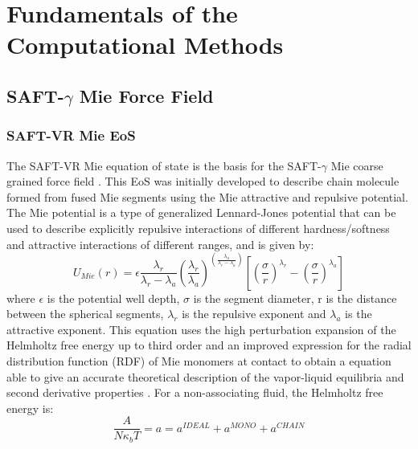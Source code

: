 \chapter{Fundamentals of the Computational Methods} %

\label{Chapter3} %


\section{SAFT-$\gamma$ Mie Force Field}

\subsection{SAFT-VR Mie EoS}

The SAFT-VR Mie equation of state \cite{lafitte2013} is the basis for the SAFT-$\gamma$ Mie coarse grained force field \cite{avendano2011}. This EoS was initially developed to describe chain molecule formed from fused Mie segments using the Mie attractive and repulsive potential. The Mie potential is a type of generalized Lennard-Jones potential that can be used to describe explicitly repulsive interactions of different hardness/softness and attractive interactions of different ranges, and is given by:
\begin{equation}
U_{Mie}(r) = \epsilon\frac{\lambda_r}{\lambda_r - \lambda_a} \left(\frac{\lambda_r}{\lambda_a} \right)^{\left( \frac{\lambda_a}{\lambda_r - \lambda_a} \right)}
\left[ \left(\frac{\sigma}{r} \right)^{\lambda_r} - \left(\frac{\sigma}{r} \right)^{\lambda_a} \right]
\label{eqn:miepotential}
\end{equation}
where $\epsilon$ is the potential well depth, $\sigma$ is the segment diameter, r is the distance between the spherical segments, $\lambda_r$ is the repulsive exponent and $\lambda_a$ is the attractive exponent. This equation uses the  high perturbation expansion of the Helmholtz free energy up to third order and an improved expression for the  radial distribution function (RDF) of Mie monomers at contact to obtain a equation able to give an accurate theoretical description of the vapor-liquid equilibria and second derivative properties \cite{lafitte2013}. For a non-associating fluid, the Helmholtz free energy is:
\begin{equation}
\frac{A}{N\kappa_{b}T} = a = a^{IDEAL} + a^{MONO} + a^{CHAIN}
\label{eqn:miehelm}
\end{equation}

